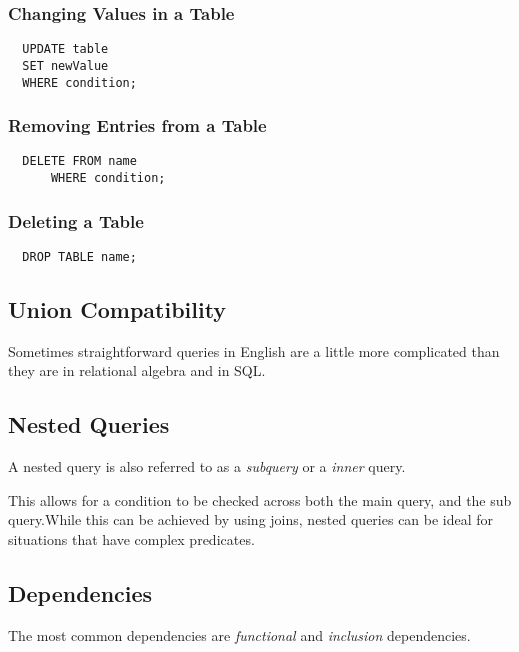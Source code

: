 \documentclass{article}
\begin{document}
\subsubsection{Changing Values in a Table}

\begin{lstlisting}
  UPDATE table
  SET newValue
  WHERE condition;
\end{lstlisting}

\subsubsection{Removing Entries from a Table}

\begin{lstlisting}
  DELETE FROM name
      WHERE condition;
\end{lstlisting}

\subsubsection{Deleting a Table}

\begin{lstlisting}
  DROP TABLE name;
\end{lstlisting}


\subsection{Union Compatibility}

Sometimes straightforward queries in English are a little more complicated than they are in relational algebra and in SQL. 

\subsection{Nested Queries}

A nested query is also referred to as a \textit{subquery} or a \textit{inner} query.

This allows for a condition to be checked across both the main query, and the sub query.While this can be achieved by using joins, nested queries can be ideal for situations that have complex predicates.

\subsection{Dependencies}

The most common dependencies are \textit{functional} and \textit{inclusion} dependencies.
\end{document}
